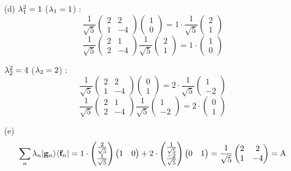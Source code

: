 \documentclass[a4paper]{article}
\begin{document}
(d) 
$\lambda_1^2=1$ ($\lambda_1=1$) :
\[
\frac{1}{\sqrt{5}}
\begin{pmatrix}
2&2\\1&-4
\end{pmatrix}
\begin{pmatrix}
1\\0
\end{pmatrix}=1\cdot\frac{1}{\sqrt{5}}
\begin{pmatrix}
2\\1
\end{pmatrix}
\]
\[
\frac{1}{\sqrt{5}}
\begin{pmatrix}
2&1\\2&-4
\end{pmatrix}\frac{1}{\sqrt{5}}
\begin{pmatrix}
2\\1
\end{pmatrix}=1\cdot\begin{pmatrix}
1\\0
\end{pmatrix}
\]

$\lambda_2^2=4$ ($\lambda_2=2$) :
\[
\frac{1}{\sqrt{5}}
\begin{pmatrix}
2&2\\1&-4
\end{pmatrix}
\begin{pmatrix}
0\\1
\end{pmatrix}=2\cdot\frac{1}{\sqrt{5}}
\begin{pmatrix}
1\\-2
\end{pmatrix}
\]
\[
\frac{1}{\sqrt{5}}
\begin{pmatrix}
2&1\\2&-4
\end{pmatrix}\frac{1}{\sqrt{5}}
\begin{pmatrix}
1\\-2
\end{pmatrix}=2\cdot\begin{pmatrix}
0\\1
\end{pmatrix}
\]

(e)
\[
\sum_n\lambda_n|\mathbf{g}_n\rangle\langle\mathbf{f}_n|=1\cdot
\begin{pmatrix}
\frac{2}{\sqrt{5}}\\\frac{1}{\sqrt{5}}
\end{pmatrix}
\begin{pmatrix}
1&0
\end{pmatrix}+2\cdot
\begin{pmatrix}
\frac{1}{\sqrt{5}}\\\frac{-2}{\sqrt{5}}
\end{pmatrix}
\begin{pmatrix}
0&1
\end{pmatrix}=
\frac{1}{\sqrt{5}}
\begin{pmatrix}
2&2\\1&-4
\end{pmatrix}=\mathrm{A}
\]
\end{document}
